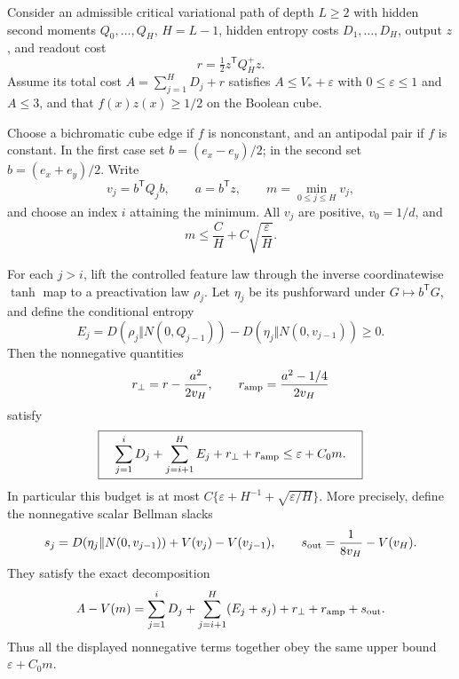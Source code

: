 \begin{theorem}
\label{thm:critical-directional-budget}
Consider an admissible critical variational path of depth $L\ge2$
with hidden second moments $Q_0,\ldots,Q_H$, $H=L-1$, hidden
entropy costs $D_1,\ldots,D_H$, output $z$, and readout cost
\[
 r=\tfrac12z^{\mathsf T}Q_H^+z.
\]
Assume its total cost $A=\sum_{j=1}^H D_j+r$ satisfies
$A\le V_*+\varepsilon$ with $0\le\varepsilon\le1$ and $A\le3$,
and that $f(x)z(x)\ge1/2$ on the Boolean cube.

Choose a bichromatic cube edge if $f$ is nonconstant, and an
antipodal pair if $f$ is constant. In the first case set
$b=(e_x-e_y)/2$; in the second set $b=(e_x+e_y)/2$.
Write
\[
 v_j=b^{\mathsf T}Q_jb,\qquad
 a=b^{\mathsf T}z,\qquad
 m=\min_{0\le j\le H}v_j,
\]
and choose an index $i$ attaining the minimum. All $v_j$ are
positive, $v_0=1/d$, and
\[
 m\le\frac C H+C\sqrt{\frac{\varepsilon}H}.
\]

For each $j>i$, lift the controlled feature law through the inverse
coordinatewise $\tanh$ map to a preactivation law $\rho_j$.
Let $\eta_j$ be its pushforward under $G\mapsto b^{\mathsf T}G$,
and define the conditional entropy
\[
 E_j=D(\rho_j\Vert N(0,Q_{j-1}))
       -D(\eta_j\Vert N(0,v_{j-1}))\ge0.
\]
Then the nonnegative quantities
\[
 r_\perp=r-\frac{a^2}{2v_H},\qquad
 r_{\rm amp}=\frac{a^2-1/4}{2v_H}
\]
satisfy
\[
 \boxed{\quad
 \sum_{j=1}^iD_j+\sum_{j=i+1}^H E_j
       +r_\perp+r_{\rm amp}
 \le\varepsilon+C_0m.
 \quad}
\]
In particular this budget is at most
$C\{\varepsilon+H^{-1}+\sqrt{\varepsilon/H}\}$.
More precisely, define the nonnegative scalar Bellman slacks
\[
 s_j=D(\eta_j\Vert N(0,v_{j-1}))+V(v_j)-V(v_{j-1}),\qquad
 s_{\rm out}=\frac1{8v_H}-V(v_H).
\]
They satisfy the exact decomposition
\[
 A-V(m)=\sum_{j=1}^iD_j+\sum_{j=i+1}^H(E_j+s_j)
          +r_\perp+r_{\rm amp}+s_{\rm out}.
\]
Thus all the displayed nonnegative terms together obey the same
upper bound $\varepsilon+C_0m$.
\end{theorem}


